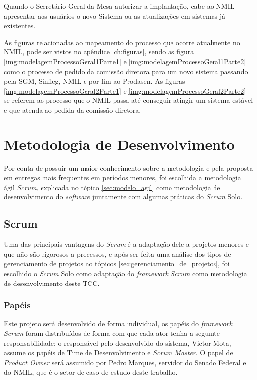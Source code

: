 Quando o Secretário Geral da Mesa autorizar a implantação, cabe ao NMIL apresentar
aos usuários o novo Sistema ou as atualizações em sistemas já existentes.

As figuras relacionadas ao mapeamento do processo que ocorre atualmente no NMIL, pode ser vistos no apêndice \ref{ch:figuras}, sendo as figura \ref{img:modelagemProcessoGeral1Parte1} e \ref{img:modelagemProcessoGeral1Parte2} como o processo de pedido da comissão diretora para um novo sistema passando pela SGM, Sinfleg, NMIL e por fim ao Prodasen. As figuras \ref{img:modelagemProcessoGeral2Parte1} e \ref{img:modelagemProcessoGeral2Parte2} se referem ao processo que o NMIL passa até conseguir atingir um sistema estável e que atenda ao pedida da comissão diretora.

\section{Metodologia de Desenvolvimento}

Por conta de possuir um maior conhecimento sobre a metodologia e pela proposta em entregas mais frequentes em períodos menores, foi escolhida a metodologia ágil \textit{Scrum}, explicada no tópico \ref{sec:modelo_agil} como metodologia de desenvolvimento do \textit{software} juntamente com algumas práticas do \textit{Scrum} Solo. 

\subsection{Scrum}

Uma das principais vantagens do \textit{Scrum} é a adaptação dele a projetos menores e que não são rigorosos a processos, e após ser feita uma análise dos tipos de gerenciamento de projetos no tópicos \ref{sec:gerenciamento_de_projetos}, foi escolhido o \textit{Scrum} Solo como adaptação do \textit{framework Scrum} como metodologia de desenvolvimento deste TCC.

\subsubsection{Papéis}

Este projeto será desenvolvido de forma individual, os papéis do \textit{framework} \textit{Scrum} foram distribuídos de forma com que cada ator tenha a seguinte responsabilidade: o responsável pelo desenvolvido do sistema, Victor Mota, assume os papéis de Time de Desenvolvimento e \textit{Scrum Master}. O papel de \textit{Product Owner} será assumido por Pedro Marques, servidor do Senado Federal e do NMIL, que é o setor de caso de estudo deste trabalho. 

